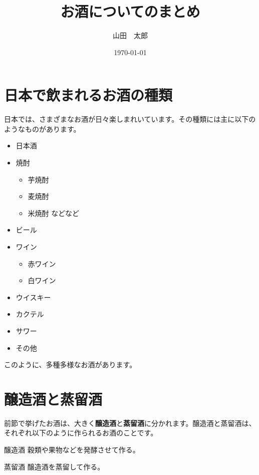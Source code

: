\documentclass[10pt,titlepage]{ltjsarticle}
\title{お酒についてのまとめ}
\author{山田　太郎}
\date{\today}
\begin{document}
\maketitle
\newpage
\tableofcontents
\newpage
\section{日本で飲まれるお酒の種類}
日本では、さまざまなお酒が日々楽しまれいています。その種類には主に以下のようなものがあります。
\begin{screen}
\begin{itemize}
\item
日本酒
\item
焼酎
\begin{itemize}
  \item
  芋焼酎
  \item
  麦焼酎
  \item
  米焼酎 などなど
\end{itemize}
\item
ビール
\item
ワイン
\begin{itemize}
  \item
  赤ワイン
  \item
  白ワイン
\end{itemize}
\item
ウイスキー
\item
カクテル
\item
サワー
\item
その他
\end{itemize}
\end{screen}
このように、多種多様なお酒があります。
\section{醸造酒と蒸留酒}
前節で挙げたお酒は、大きく\textbf{醸造酒}と\textbf{蒸留酒}に分かれます。醸造酒と蒸留酒は、それぞれ以下のように作られるお酒のことです。

\begin{itembox}[l]{醸造酒}
穀類や果物などを発酵させて作る。
\end{itembox}

\begin{itembox}[l]{蒸留酒}
醸造酒を蒸留して作る。
\end{itembox}
\end{document}
